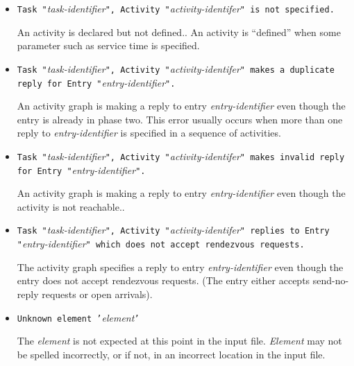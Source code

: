 \begin{itemize}
\item \texttt{Task "}\emph{task-identifier}\texttt{", Activity
    "}\emph{activity-identifer}\texttt{" is not specified.}
  
  An activity is declared but not defined..  An
  activity is ``defined'' when some parameter
  such as service time is specified.

\item \texttt{Task "}\emph{task-identifier}\texttt{", Activity
    "}\emph{activity-identifer}\texttt{" makes a duplicate reply for
    Entry "}\emph{entry-identifier}\texttt{".}
  
  An activity graph is making a reply to entry \emph{entry-identifier}
  even though the entry is already in phase
  two.  This error usually occurs when
  more than one reply to \emph{entry-identifier} is specified in a
  sequence of activities.

\item \texttt{Task "}\emph{task-identifier}\texttt{", Activity
    "}\emph{activity-identifer}\texttt{" makes invalid reply for Entry
    "}\emph{entry-identifier}\texttt{".}
  
  An activity graph is making a reply to entry \emph{entry-identifier}
  even though the activity is not
  reachable..

\item \texttt{Task "}\emph{task-identifier}\texttt{", Activity
    "}\emph{activity-identifer}\texttt{" replies to Entry
    "}\emph{entry-identifier}\texttt{" which does not accept rendezvous requests.}
  
  The activity graph specifies a reply to
  entry \emph{entry-identifier} even though the entry does not accept
  rendezvous requests.  (The entry either accepts send-no-reply
  requests or open arrivals).

\item \texttt{Unknown element '}\emph{element}\texttt{'}
  
  The \emph{element} is not expected at this point in the input file.
  \emph{Element} may not be spelled incorrectly, or if not, in an incorrect location in the input file.

\end{itemize}

